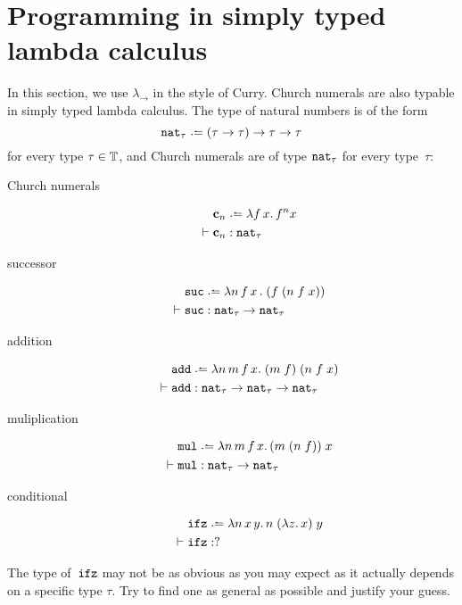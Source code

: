 \section{Programming in simply typed lambda calculus}
In this section, we use $\lambda_\to$ in the style of Curry.  
Church numerals are also typable in simply typed lambda calculus.
The type of natural numbers is of the form
\[
  \nat_\tau \defeq (\tau \to \tau) \to \tau \to \tau
\]
for every type $\tau \in \mathbb{T}$, and Church
numerals are of type $\mathtt{nat}_\tau$ for every type~$\tau$:
  \begin{description}
    \item[Church numerals]
      \begin{align*}
        & \bc_n \defeq \lambda f\,x.\,
        f^n x \\
        \vdash{} & \bc_n : \nat_\tau
      \end{align*}
    \item[successor]
      \begin{align*}
        & \suc \defeq \lambda n \,f\,x\,.\;(f\;(n\;f\;x)) \\
        \vdash{} & \suc : \nat_\tau \to \nat_\tau
      \end{align*}
    \item[addition]
      \begin{align*}
        & \add \defeq \lambda n\,m\,f\,x.\; (m\;f)\;(n\;f\;x) \\
        \vdash{} & \add : \nat_\tau \to \nat_\tau \to \nat_\tau
      \end{align*}
    \item[muliplication] 
      \begin{align*}
        & \mul \defeq \lambda n\,m\,f\,x.\, (m\;(n\;f))\;x\\
      \vdash{} & \mul : \nat_\tau \to \nat_\tau
      \end{align*}
    \item[conditional]
      \begin{align*}
        & \ifz \defeq \lambda n\,x\,y.\, n\;(\lambda z.\, x)\;y\\
        \vdash {} & \ifz : ?
      \end{align*}
  \end{description}
The type of~$\mathtt{ifz}$ may not be as obvious as you may expect as it actually
depends on a specific type $\tau$. Try to find one as general as possible and
justify your guess.

